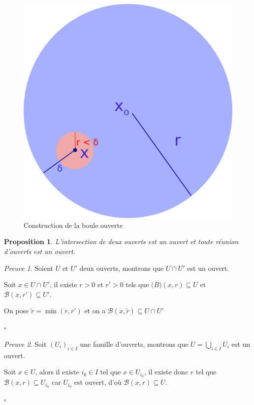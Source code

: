 \documentclass[]{article}
\newtheorem{myproposition}{Proposition}
\theoremstyle{remark}
\newtheorem{myproof}{Preuve}
\theoremstyle{definition}
\newcommand{\cqfd}{
	\hfill$\square$
}
\begin{document}
\begin{figure}[h!]
	\centering
	\includegraphics[width=350pt]{Schema2}
	\caption{Construction de la boule ouverte}
\end{figure}

\begin{myproposition}
	L'intersection de deux ouverts est un ouvert et toute réunion d'ouverts est un ouvert.
\end{myproposition}

\begin{myproof}
	Soient $U$ et $U'$ deux ouverts, montrons que $U \cap U'$ est un ouvert.
	
	Soit $x \in U \cap U'$, il existe $r>0$ et $r'>0$ tels que $\mathcal(B)(x, r) \subseteq U$ et $\mathcal{B}(x, r') \subseteq U'$.

	On pose $\widetilde{r}=\min(r, r')$ et on a $\mathcal{B}(x, \widetilde{r}) \subseteq U \cap U'$
	
	\cqfd
\end{myproof}

\begin{myproof}
	Soit $(U_i)_{i \in I}$ une famille d'ouverts, montrons que $U = \displaystyle \bigcup_{i \in I} U_i$ est un ouvert.
	
	Soit $x \in U$, alors il existe $i_0 \in I$ tel que $x \in U_{i_0}$, il existe donc $r$ tel que $\mathcal{B}(x, r) \subseteq U_{i_0}$ car $U_{i_0}$ est ouvert, d'où $\mathcal{B}(x, r) \subseteq U$.
	
	\cqfd
\end{myproof}
\end{document}
